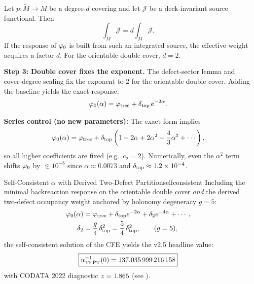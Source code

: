 \begin{tcolorbox}[colback=blue!3, colframe=blue!40, 
    title={\textbf{Lemma (Cover-Degree Scaling of Deck-Invariant Response)}}, fonttitle=\bfseries\small]
Let $p:\widetilde{M}\to M$ be a degree-$d$ covering and let $\mathcal{J}$ be a deck-invariant
source functional. Then
\begin{equation}
    \int_{\widetilde{M}}\mathcal{J} = d \int_{M}\mathcal{J}.
\end{equation}
If the response of $\varphi_0$ is built from such an integrated source, the effective
weight acquires a factor $d$. For the orientable double cover, $d=2$.
\end{tcolorbox}

\textbf{Step 3: Double cover fixes the exponent.}
The defect-sector lemma and cover-degree scaling fix the exponent to $2$ for the
orientable double cover. Adding the baseline yields the exact response:
\begin{equation}
    \varphi_0(\alpha) = \varphi_{\mathrm{tree}} + \delta_{\mathrm{top}}\,e^{-2\alpha}.
\end{equation}

\begin{remark}
\textbf{Series control (no new parameters):} The exact form implies
\begin{equation}
    \varphi_0(\alpha)=\varphi_{\mathrm{tree}}+\delta_{\mathrm{top}}\left(1-2\alpha+2\alpha^2-\frac{4}{3}\alpha^3+\cdots\right),
\end{equation}
so all higher coefficients are fixed (e.g.\ $c_2=2$). Numerically, even the
$\alpha^2$ term shifts $\varphi_0$ by $\lesssim 10^{-8}$ since
$\alpha\approx 0.0073$ and $\delta_{\mathrm{top}}\approx 1.2\times10^{-4}$.
\end{remark}

\begin{theorem}{Self-Consistent $\alpha$ with Derived Two-Defect Partition}{selfconsistent}
Including the minimal backreaction response on the orientable double cover \emph{and} the derived two-defect occupancy weight anchored by holonomy degeneracy $g=5$:
\begin{align}
    \varphi_0(\alpha) &= \varphi_{\mathrm{tree}} + \delta_{\mathrm{top}} e^{-2\alpha} + \delta_2 e^{-4\alpha} + \cdots,
    \label{eq:backreaction}\\
    \delta_2 &= \frac{g}{4}\,\delta_{\mathrm{top}}^2 = \frac54\,\delta_{\mathrm{top}}^2,
    \qquad (g=5),
\end{align}
the self-consistent solution of the CFE yields the v2.5 headline value:
\begin{equation}
    \boxed{\alpha^{-1}_{\text{TFPT}}(0) = \num[round-mode=places,round-precision=12]{\TFPTalphaInvGOverFourNum}}
\end{equation}
with CODATA 2022 diagnostic $z=\num[round-mode=places,round-precision=3]{\TFPTalphaZGOverFourNum}$ (see ).
\end{theorem}


